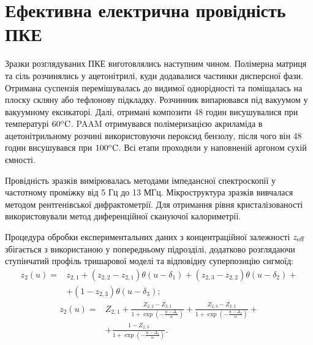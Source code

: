 \documentclass[14pt,twoside]{vakthesis}
\begin{document}
\section{Ефективна електрична провідність ПКЕ}

Зразки розглядуваних ПКЕ \cite{Przl1995, Wiec1994} виготовлялись наступним чином. Полімерна матриця та сіль розчинялись у ацетонітрилі, куди додавалися частинки дисперсної фази. Отримана суспензія перемішувалась до видимої однорідності та поміщалась на плоску скляну або тефлонову підкладку. Розчинник випарювався під вакуумом у вакуумному ексикаторі. Далі, отримані композити 48 годин висушувалися при температурі $\rm 60^{o}C$. PAAM отримувався полімеризацією акриламіда в ацетонітрильному розчині використовуючи пероксид бензолу, після чого він 48 годин висушувався при $\rm 100^{o}C$. 
Всі етапи проходили у наповненій аргоном сухій ємності.

Провідність зразків вимірювалась методами імпедансної спектроскопії у частотному проміжку від 5 Гц до 13 МГц. Мікроструктура зразків вивчалася методом рентгенівської дифрактометрії. Для отримання рівня кристалізованості використовували метод диференційної скануючої калориметрії.


Процедура обробки експериментальних даних з концентраційної залежності ${z}_{\rm eff}$ збігається з використаною у попередньому підрозділі, додатково розглядаючи ступінчатий профіль тришарової моделі та відповідну суперпозицію сигмоїд:
\begin{equation}\label{eq:profilex2-triple}
\begin{split}
{z}_2 (u) =& {z}_{2,1} +
({z}_{2,2} - {z}_{2,1}) \theta(u - \delta_1) + ({z}_{2,3} - {z}_{2,2}) \theta(u - \delta_2) +\\
&+ (1 - {z}_{2,3}) \theta(u - \delta_3);
\end{split}
\end{equation}
\begin{equation}\label{eq:profilex2-sigmoid3}
\begin{split}
{z}_2 (u) =& {Z}_{2,1} 
+ \frac{{Z}_{2,2} - {Z}_{2,1}}{1 + \exp{\left( - \frac{u - \Delta_1}{\alpha} \right)}}  + \frac{{Z}_{2,3} - {Z}_{2,2}}{1 + \exp{\left( - \frac{u - \Delta_2}{\alpha} \right)}} +\\
&+ \frac{1 - {Z}_{2,3}}{1 + \exp{\left( - \frac{u - \Delta_3}{\alpha} \right)}}.
\end{split}
\end{equation}
\end{document}
